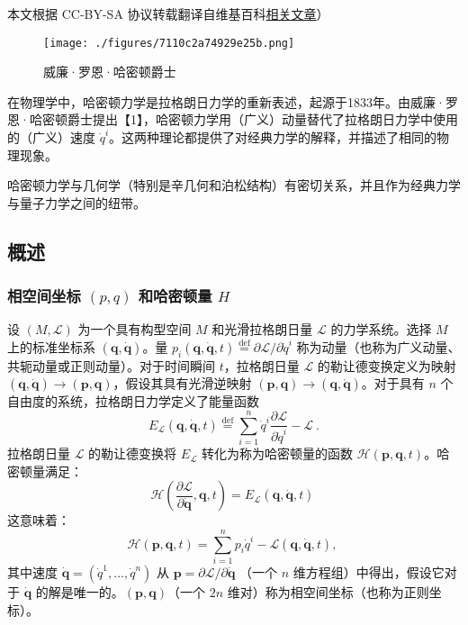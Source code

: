 
本文根据 CC-BY-SA 协议转载翻译自维基百科\href{https://en.wikipedia.org/wiki/Hamiltonian_mechanics}{相关文章}）

\begin{figure}[ht]
\centering
\texttt{[image: ./figures/7110c2a74929e25b.png]}
\caption{威廉·罗恩·哈密顿爵士} \label{fig_HMD_1}
\end{figure}
在物理学中，哈密顿力学是拉格朗日力学的重新表述，起源于1833年。由威廉·罗恩·哈密顿爵士提出【1】，哈密顿力学用（广义）动量替代了拉格朗日力学中使用的（广义）速度 \( \dot{q}^i \)。这两种理论都提供了对经典力学的解释，并描述了相同的物理现象。

哈密顿力学与几何学（特别是辛几何和泊松结构）有密切关系，并且作为经典力学与量子力学之间的纽带。
\subsection{概述}  
\subsubsection{相空间坐标 \( (p, q) \) 和哈密顿量 \( H \)}  
设 \( (M, \mathcal{L}) \) 为一个具有构型空间 \( M \) 和光滑拉格朗日量 \( \mathcal{L} \) 的力学系统。选择 \( M \) 上的标准坐标系 \( (\boldsymbol{q}, \boldsymbol{\dot{q}}) \)。量 \( p_i(\boldsymbol{q}, \boldsymbol{\dot{q}}, t) \stackrel{\text{def}}{=} \partial \mathcal{L} / \partial \dot{q}^i \) 称为动量（也称为广义动量、共轭动量或正则动量）。对于时间瞬间 \( t \)，拉格朗日量 \( \mathcal{L} \) 的勒让德变换定义为映射 \( (\boldsymbol{q}, \boldsymbol{\dot{q}}) \to (\boldsymbol{p}, \boldsymbol{q}) \)，假设其具有光滑逆映射 \( (\boldsymbol{p}, \boldsymbol{q}) \to (\boldsymbol{q}, \boldsymbol{\dot{q}}) \)。对于具有 \( n \) 个自由度的系统，拉格朗日力学定义了能量函数
\[
E_{\mathcal{L}}(\boldsymbol{q}, \boldsymbol{\dot{q}}, t) \stackrel{\text{def}}{=} \sum_{i=1}^{n} \dot{q}^i \frac{\partial \mathcal{L}}{\partial \dot{q}^i} - \mathcal{L} ~.
\]
拉格朗日量 \( \mathcal{L} \) 的勒让德变换将 \( E_{\mathcal{L}} \) 转化为称为哈密顿量的函数 \( \mathcal{H}(\boldsymbol{p}, \boldsymbol{q}, t) \)。哈密顿量满足：
\[
\mathcal{H}\left(\frac{\partial \mathcal{L}}{\partial \boldsymbol{\dot{q}}}, \boldsymbol{q}, t\right) = E_{\mathcal{L}}(\boldsymbol{q}, \boldsymbol{\dot{q}}, t)~
\]
这意味着：
\[
\mathcal{H}(\boldsymbol{p}, \boldsymbol{q}, t) = \sum_{i=1}^{n} p_i \dot{q}^i - \mathcal{L}(\boldsymbol{q}, \boldsymbol{\dot{q}}, t),~
\]
其中速度 \( \boldsymbol{\dot{q}} = (\dot{q}^1, \dots, \dot{q}^n) \) 从 \( \boldsymbol{p} = \partial \mathcal{L} / \partial \boldsymbol{\dot{q}} \) （一个 \( n \) 维方程组）中得出，假设它对于 \( \boldsymbol{\dot{q}} \) 的解是唯一的。\( ( \boldsymbol{p}, \boldsymbol{q} ) \)（一个 \( 2n \) 维对）称为相空间坐标（也称为正则坐标）。
